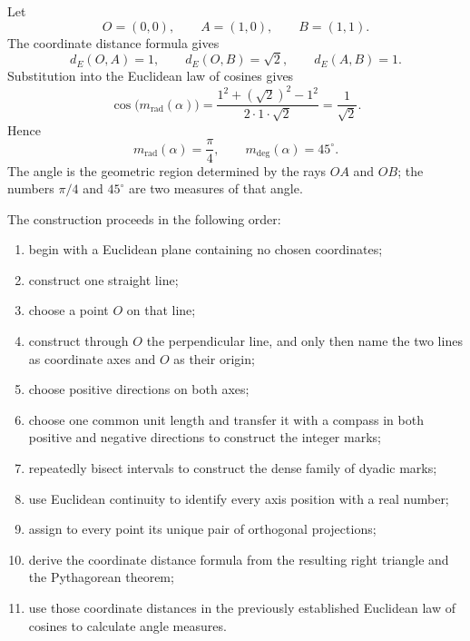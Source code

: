 \begin{examplebox}
Let
\[
O=(0,0),\qquad A=(1,0),\qquad B=(1,1).
\]
The coordinate distance formula gives
\[
d_E(O,A)=1,
\qquad
d_E(O,B)=\sqrt2,
\qquad
d_E(A,B)=1.
\]
Substitution into the Euclidean law of cosines gives
\[
\cos\bigl(m_{\mathrm{rad}}(\alpha)\bigr)
=
\frac{1^2+(\sqrt2)^2-1^2}{2\cdot1\cdot\sqrt2}
=
\frac{1}{\sqrt2}.
\]
Hence
\[
m_{\mathrm{rad}}(\alpha)=\frac{\pi}{4},
\qquad
m_{\deg}(\alpha)=45^\circ.
\]
The angle is the geometric region determined by the rays $OA$ and $OB$; the
numbers $\pi/4$ and $45^\circ$ are two measures of that angle.
\end{examplebox}

\begin{summarybox}
The construction proceeds in the following order:
\begin{enumerate}
    \item begin with a Euclidean plane containing no chosen coordinates;
    \item construct one straight line;
    \item choose a point $O$ on that line;
    \item construct through $O$ the perpendicular line, and only then name the
          two lines as coordinate axes and $O$ as their origin;
    \item choose positive directions on both axes;
    \item choose one common unit length and transfer it with a compass in both
          positive and negative directions to construct the integer marks;
    \item repeatedly bisect intervals to construct the dense family of dyadic
          marks;
    \item use Euclidean continuity to identify every axis position with a real
          number;
    \item assign to every point its unique pair of orthogonal projections;
    \item derive the coordinate distance formula from the resulting right
          triangle and the Pythagorean theorem;
    \item use those coordinate distances in the previously established
          Euclidean law of cosines to calculate angle measures.
\end{enumerate}
\end{summarybox}
